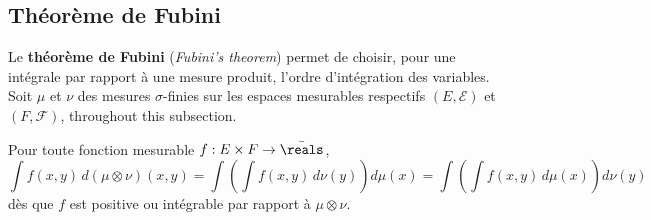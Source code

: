 \subsection{Théorème de Fubini}

Le \textbf{théorème de Fubini} (\textit{Fubini's theorem}) permet de choisir, pour
une intégrale par rapport à une mesure produit, l'ordre d'intégration des variables.
Soit $\mu$ et $\nu$ des mesures $\sigma$-finies sur les espaces mesurables
respectifs $(E,\mathcal{E})$ et $(F,\mathcal{F})$, throughout this subsection.

\begin{theorem}
  Pour toute fonction mesurable $f : E \times F \to \bar{\reals}$,
  \[
    \int f(x,y) \, d(\mu \otimes \nu)(x,y)
    = \int \left( \int f(x,y) \, d\nu(y) \right) d\mu(x)
    = \int \left( \int f(x,y) \, d\mu(x) \right) d\nu(y)
  \]
  dès que $f$ est positive ou intégrable par rapport à $\mu \otimes \nu$.
\end{theorem}

